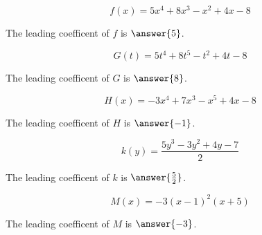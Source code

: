 \documentclass{ximera}
\author{Lee Wayand}
\begin{document}
\begin{example}








\begin{question}


\[
f(x) = 5x^4 + 8x^3 - x^2 + 4x - 8
\]


The leading coefficent of $f$ is $\answer{5}$.

\end{question}







\begin{question}


\[
G(t) = 5t^4 + 8t^5 - t^2 + 4t - 8
\]


The leading coefficent of $G$ is $\answer{8}$.

\end{question}











\begin{question}


\[
H(x) = -3x^4 + 7x^3 - x^5 + 4x - 8
\]


The leading coefficent of $H$ is $\answer{-1}$.

\end{question}








\begin{question}


\[
k(y) = \frac{5y^3 - 3y^2 + 4y - 7}{2}
\]


The leading coefficent of $k$ is $\answer{\frac{5}{2}}$.

\end{question}










\begin{question}


\[
M(x) = -3(x-1)^2(x+5)
\]


The leading coefficent of $M$ is $\answer{-3}$.

\end{question}












\end{example}
\end{document}
